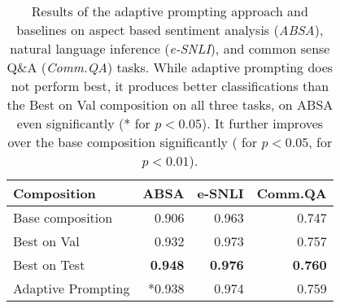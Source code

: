 \begin{table}
    \small
    \centering
    \begin{tabular}{lrrr}
        \toprule
        \textbf{Composition} & \textbf{ABSA} & \textbf{e-SNLI} & \textbf{Comm.QA} \\
        \midrule
        Base composition & 0.906 & 0.963 & 0.747 \\
        [.5em]
        Best on Val & 0.932 & 0.973 & 0.757 \\
        Best on Test & \textbf{0.948} & \textbf{0.976} & \textbf{0.760} \\
        [.5em]
        Adaptive Prompting & \ddag{}*0.938 & \ddag{}0.974 & \dag{}0.759 \\
        \bottomrule
    \end{tabular}

    \caption{Results of the adaptive prompting approach and baselines on aspect based sentiment analysis (\textit{ABSA}), natural language inference (\textit{e-SNLI}), and common sense Q\&A (\textit{Comm.QA}) tasks. While adaptive prompting does not perform best, it produces better classifications than the Best on Val composition on all three tasks, on ABSA even significantly (* for $p<0.05$). It further improves over the base composition significantly (\dag{} for $p<0.05$, \ddag{} for $p<0.01$).}
    \label{tab:other-tasks-results}
\end{table}
